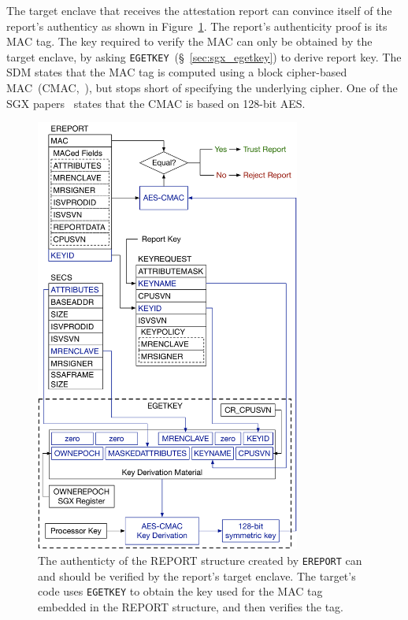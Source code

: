 
The target enclave that receives the attestation report can convince itself of
the report's authenticy as shown in Figure~\ref{fig:sgx_ereport_check}. The
report's authenticity proof is its MAC tag. The key required to verify the MAC
can only be obtained by the target enclave, by asking
\texttt{EGETKEY}~(\S~\ref{sec:sgx_egetkey}) to derive report key. The SDM
states that the MAC tag is computed using a block cipher-based
MAC~(CMAC,~\cite{fips2005cmac}), but stops short of specifying the underlying
cipher. One of the SGX papers~\cite{anati2013sgx} states that the CMAC is based
on 128-bit AES.


\begin{figure}[hbt]
  \centering
  \includegraphics[width=87mm]{figures/sgx_ereport_check.pdf}
  \caption{
    The authenticty of the REPORT structure created by \texttt{EREPORT} can and
    should be verified by the report's target enclave. The target's code uses
    \texttt{EGETKEY} to obtain the key used for the MAC tag embedded in the
    REPORT structure, and then verifies the tag.
  }
  \label{fig:sgx_ereport_check}
\end{figure}

